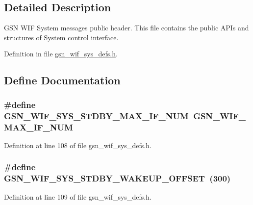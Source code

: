 \subsection{Detailed Description}
GSN WIF System messages public header. This file contains the public APIs and structures of System control interface. 

Definition in file \hyperlink{a00612_source}{gsn\_\-wif\_\-sys\_\-defs.h}.



\subsection{Define Documentation}
\hypertarget{a00612_aaa47aebadfeb0f51841b56c5dfa56bf4}{
\subsubsection[{GSN\_\-WIF\_\-SYS\_\-STDBY\_\-MAX\_\-IF\_\-NUM}]{\setlength{\rightskip}{0pt plus 5cm}\#define GSN\_\-WIF\_\-SYS\_\-STDBY\_\-MAX\_\-IF\_\-NUM~GSN\_\-WIF\_\-MAX\_\-IF\_\-NUM}}
\label{a00612_aaa47aebadfeb0f51841b56c5dfa56bf4}


Definition at line 108 of file gsn\_\-wif\_\-sys\_\-defs.h.

\hypertarget{a00612_a4398fd372a03b37ae3fdc1ba14232e94}{
\subsubsection[{GSN\_\-WIF\_\-SYS\_\-STDBY\_\-WAKEUP\_\-OFFSET}]{\setlength{\rightskip}{0pt plus 5cm}\#define GSN\_\-WIF\_\-SYS\_\-STDBY\_\-WAKEUP\_\-OFFSET~(300)}}
\label{a00612_a4398fd372a03b37ae3fdc1ba14232e94}


Definition at line 109 of file gsn\_\-wif\_\-sys\_\-defs.h.



